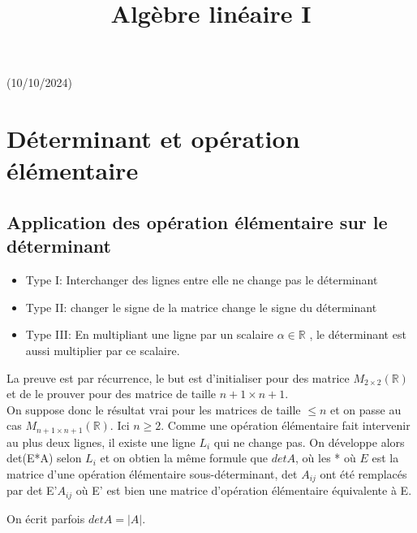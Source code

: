 \documentclass[11pt]{book}
\begin{document}
\setcounter{section}{8}
\title{Algèbre linéaire I}
\maketitle
\thispagestyle{empty}

\begin{center}

\begin{framedate}
    (10/10/2024)
\end{framedate}
\end{center}
\section{Déterminant et opération élémentaire}
\subsection{Application des opération élémentaire sur le déterminant}
\begin{itemize}
    \item Type I: Interchanger des lignes entre elle ne change pas le déterminant
    \item Type II: changer le signe de la matrice change le signe du déterminant
    \item Type III: En multipliant une ligne par un scalaire $\alpha \in \mathbb{R}$ , le déterminant est aussi multiplier par ce scalaire.

     
\end{itemize}

La preuve est par récurrence, le but est d'initialiser pour des matrice $M_{2\times 2}(\mathbb{R})$ et de le prouver pour des matrice de taille $n+1\times n+1$. 
\\
On suppose donc le résultat vrai pour les matrices de taille $\leq n$ et on passe au cas $M_{n+1\times n+1}(\mathbb{R})$. Ici $n \geq 2$. Comme une opération élémentaire fait intervenir au plus deux lignes, il existe une ligne $L_i$ qui ne change pas. On développe alors det(E*A) selon $L_i$ et on obtien la même formule que $det A$, où les * où $E$ est la matrice d'une opération élémentaire sous-déterminant, det $A_{ij}$ ont été remplacés par det E'$A_{ij}$ où E' est bien une matrice d'opération élémentaire équivalente à E.
\begin{framedremark}
    On écrit parfois $det A = |A|$.
\end{framedremark}
    
\end{document}
